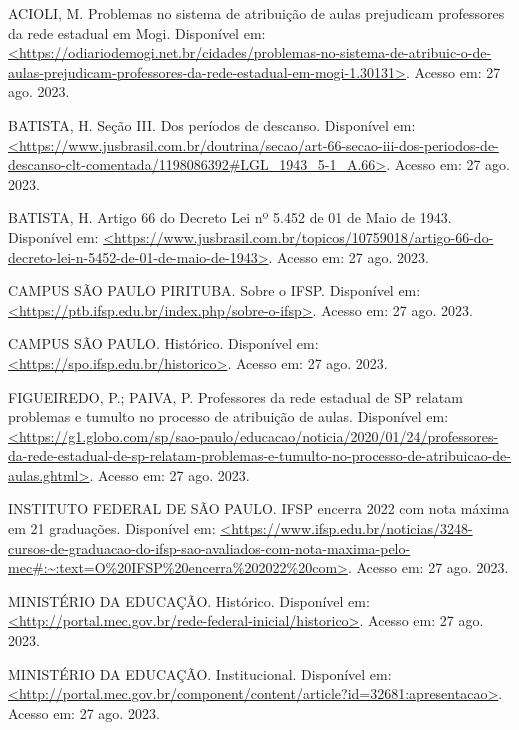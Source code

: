\documentclass[12pt]{article}
\begin{document}
\begingroup
\renewcommand{\section}[2]{}%
\begin{thebibliography}{11}

ACIOLI, M. Problemas no sistema de atribuição de aulas prejudicam professores da rede estadual em Mogi. Disponível em: \url{<https://odiariodemogi.net.br/cidades/problemas-no-sistema-de-atribuic-o-de-aulas-prejudicam-professores-da-rede-estadual-em-mogi-1.30131>}. Acesso em: 27 ago. 2023.

BATISTA, H. Seção III. Dos períodos de descanso. Disponível em: \url{<https://www.jusbrasil.com.br/doutrina/secao/art-66-secao-iii-dos-periodos-de-descanso-clt-comentada/1198086392#LGL_1943_5-1_A.66>}. Acesso em: 27 ago. 2023.

BATISTA, H. Artigo 66 do Decreto Lei nº 5.452 de 01 de Maio de 1943. Disponível em: \url{<https://www.jusbrasil.com.br/topicos/10759018/artigo-66-do-decreto-lei-n-5452-de-01-de-maio-de-1943>}. Acesso em: 27 ago. 2023.

CAMPUS SÃO PAULO PIRITUBA. Sobre o IFSP. Disponível em: \url{<https://ptb.ifsp.edu.br/index.php/sobre-o-ifsp>}. Acesso em: 27 ago. 2023.

CAMPUS SÃO PAULO. Histórico. Disponível em: \url{<https://spo.ifsp.edu.br/historico>}. Acesso em: 27 ago. 2023.

FIGUEIREDO, P.; PAIVA, P. Professores da rede estadual de SP relatam problemas e tumulto no processo de atribuição de aulas. Disponível em: \url{<https://g1.globo.com/sp/sao-paulo/educacao/noticia/2020/01/24/professores-da-rede-estadual-de-sp-relatam-problemas-e-tumulto-no-processo-de-atribuicao-de-aulas.ghtml>}. Acesso em: 27 ago. 2023.

INSTITUTO FEDERAL DE SÃO PAULO. IFSP encerra 2022 com nota máxima em 21 graduações. Disponível em: \url{<https://www.ifsp.edu.br/noticias/3248-cursos-de-graduacao-do-ifsp-sao-avaliados-com-nota-maxima-pelo-mec#:~:text=O%20IFSP%20encerra%202022%20com>}. Acesso em: 27 ago. 2023.

MINISTÉRIO DA EDUCAÇÃO. Histórico. Disponível em: \url{<http://portal.mec.gov.br/rede-federal-inicial/historico>}. Acesso em: 27 ago. 2023.

MINISTÉRIO DA EDUCAÇÃO. Institucional. Disponível em: \url{<http://portal.mec.gov.br/component/content/article?id=32681:apresentacao>}. Acesso em: 27 ago. 2023.


\end{thebibliography}
\end{document}
